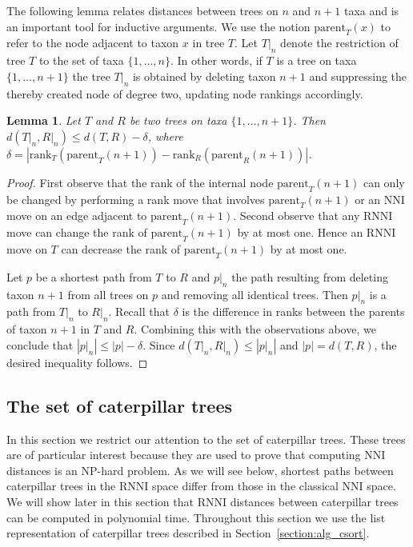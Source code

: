 \documentclass{amsart}
\newcommand{\parent}{\mathrm{parent}}
\newcommand{\rank}{\mathrm{rank}}
\newcommand{\nni}{\mathrm{NNI}}
\newcommand{\rnni}{\mathrm{RNNI}}
\newtheorem{lemma}[theorem]{Lemma}
\begin{document}
The following lemma relates distances between trees on $n$ and $n+1$ taxa and is an important tool for inductive arguments.
We use the notion $\parent_T(x)$ to refer to the node adjacent to taxon $x$ in tree $T$.
Let $T{\big|}_n$ denote the restriction of tree $T$ to the set of taxa $\{1, \ldots, n\}$.
In other words, if $T$ is a tree on taxa $\{1, \ldots, n+1\}$ the tree $T{\big|}_n$ is obtained by deleting taxon $n+1$ and suppressing the thereby created node of degree two, updating node rankings accordingly.

\begin{lemma}
Let $T$ and $R$ be two trees on taxa $\{1, \ldots, {n+1}\}$.
Then ${d(T{\big|}_n, R{\big|}_n) \leq d(T,R) - \delta}$, where $\delta = |\rank_T(\parent_T(n+1)) - \rank_R(\parent_R(n+1))|$.
\label{lemma:distance_delete_taxon}
\end{lemma}

\begin{proof}
First observe that the rank of the internal node $\parent_T(n+1)$ can only be changed by performing a rank move that involves $\parent_T(n+1)$ or an $\nni$ move on an edge adjacent to $\parent_T(n+1)$.
Second observe that any $\rnni$ move can change the rank of $\parent_T(n+1)$ by at most one.
Hence an $\rnni$ move on $T$ can decrease the rank of $\parent_T(n+1)$ by at most one.

Let $p$ be a shortest path from $T$ to $R$ and $p{\big|}_n$ the path resulting from deleting taxon $n+1$ from all trees on $p$ and removing all identical trees.
Then $p{\big|}_n$ is a path from $T{\big|}_n$ to $R{\big|}_n$.
Recall that $\delta$ is the difference in ranks between the parents of taxon $n+1$ in $T$ and $R$.
Combining this with the observations above, we conclude that $|p{\big|}_n| \leq |p| - \delta$.
Since $d(T{\big|}_n,R{\big|}_n) \leq |p{\big|}_n|$ and $|p| = d(T,R)$, the desired inequality follows.
\end{proof}


\subsection{The set of caterpillar trees}
\label{section:caterpillar_convex}

In this section we restrict our attention to the set of caterpillar trees.
These trees are of particular interest because they are used to prove that computing $\nni$ distances is an NP-hard problem.
As we will see below, shortest paths between caterpillar trees in the $\rnni$ space differ from those in the classical $\nni$ space.
We will show later in this section that $\rnni$ distances between caterpillar trees can be computed in polynomial time.
Throughout this section we use the list representation of caterpillar trees described in Section~\ref{section:alg_csort}.
\end{document}
